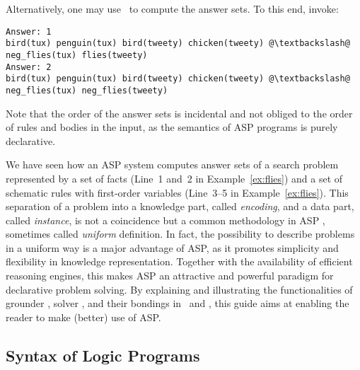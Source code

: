 \begin{example}
{  Alternatively, one may use \clingo\ to compute the answer sets.
  To this end, invoke:\\
  }
%
\begin{lstlisting}[numbers=none,escapechar=@]
Answer: 1
bird(tux) penguin(tux) bird(tweety) chicken(tweety) @\textbackslash@
neg_flies(tux) flies(tweety)
Answer: 2
bird(tux) penguin(tux) bird(tweety) chicken(tweety) @\textbackslash@
neg_flies(tux) neg_flies(tweety)
\end{lstlisting}
%
Note that the order of the answer sets is incidental and 
not obliged to the order of rules and bodies in the input,
as the semantics of ASP programs is purely declarative.
\eexample
\end{example}

We have seen how an ASP system computes answer sets of a search problem
represented by a set of facts (Line~1 and~2 in Example~\ref{ex:flies})
and a set of schematic rules with first-order variables
(Line~3--5 in Example~\ref{ex:flies}).
This separation of a problem into a knowledge part, called \emph{encoding},
and a data part, called \emph{instance}, is not a coincidence
but a common methodology in ASP \cite{martru99a,niemela99a,schlipf95a},
sometimes called \emph{uniform} definition.
In fact, the possibility to describe problems in a uniform way is
a major advantage of ASP, as it promotes simplicity and flexibility in
knowledge representation.
Together with the availability of efficient reasoning engines,
this makes ASP an attractive and powerful paradigm
for declarative problem solving.
By explaining and illustrating the functionalities of
grounder \gringo, solver \clasp, and their bondings in \clingo\ and \iclingo,
this guide aims at enabling the reader to make (better) use of ASP.


\subsection{Syntax of Logic Programs}\label{subsec:syntax}

